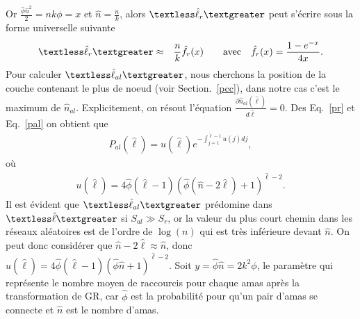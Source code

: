 Or $\frac{\hat{\phi}\hat{n}^2}{2}=nk\phi=x$ et $\hat{n}=\frac{n}{k}$, alors $\textless \hat{\ell}_r \textgreater$ peut s'écrire sous la forme universelle suivante
\begin{eqnarray}
\textless \hat{\ell}_r \textgreater&\approx&\frac{n}{k}\hat{f}_r(x) \quad \quad \textrm{avec} \quad \hat{f}_r(x)=\frac{1-e^{-x}}{4x}.
\label{lr}
\end{eqnarray}
Pour calculer $\textless \hat{\ell}_{al} \textgreater$, nous cherchons la position de la couche contenant le plus de noeud (voir Section.~\ref{pcc}), dans notre cas c'est le maximum de  $\hat{n}_{al}$. Explicitement, on résout l'équation $\frac{\partial \hat{n}_{al}(\hat{\ell})}{d\hat{\ell}}=0$. Des Eq.~\eqref{pr} et Eq.~\eqref{pal} on obtient que
\begin{eqnarray}
P_{al}(\hat{\ell})=u(\hat{\ell})e^{-\int_{j=1}^{\hat{\ell}-1}u(j)dj},
\label{Pal}
\end{eqnarray}
où 
\begin{eqnarray}
u(\hat{\ell})=4\hat{\phi}(\hat{\ell}-1)(\hat{\phi}(\hat{n}-2\hat{\ell})+1)^{\hat{\ell}-2}.
\label{ul}
\end{eqnarray}
Il est évident que $\textless \hat{\ell}_{al} \textgreater$ prédomine dans $\textless \hat{\ell} \textgreater$ si $S_{al}\gg S_r$, or la valeur du plus court chemin dans les réseaux aléatoires est de l'ordre de $\log(n)$ qui est très inférieure devant $\hat{n}$. On peut donc considérer que $\hat{n}-2\hat{\ell}\approx \hat{n}$, donc
$u(\hat{\ell})=4\hat{\phi}(\hat{\ell}-1)(\hat{\phi}\hat{n}+1)^{\hat{\ell}-2}$. Soit  $y=\hat{\phi}\hat{n}=2k^2\phi$, le paramètre qui représente le nombre moyen de raccourcis pour chaque \textsf{amas} après la transformation de GR, car $\hat{\phi}$ est la probabilité pour qu'un pair d'\textsf{\textsf{amas}} se connecte et $\hat{n}$ est le nombre d'\textsf{\textsf{amas}}.\\



